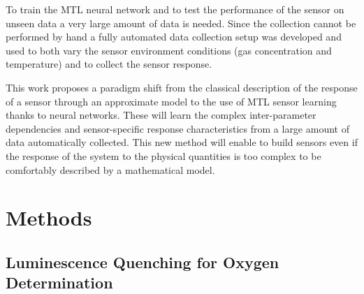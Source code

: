 \documentclass[sensors,article,submit,moreauthors,pdftex,10pt,a4paper]{Definitions/mdpi}
\begin{document}
To train the MTL neural network and to test the performance of the sensor on unseen data a very large amount of data is needed. Since the collection  cannot be performed by hand a fully automated data collection setup was developed and used to both vary the sensor environment conditions (gas concentration and temperature) and to collect the sensor response. 

This work proposes a paradigm shift from the classical description of the response of a sensor through an approximate model to the use of MTL sensor learning thanks to neural networks. 
These will learn the complex inter-parameter dependencies and sensor-specific response characteristics from a large amount of data automatically collected. This new method will enable to build sensors even if the response of the system to the physical quantities is too complex to be comfortably described by a mathematical model.


\section{Methods}
\label{sec:methods}

\subsection{Luminescence Quenching for Oxygen Determination}
\label{Theory}
\end{document}
